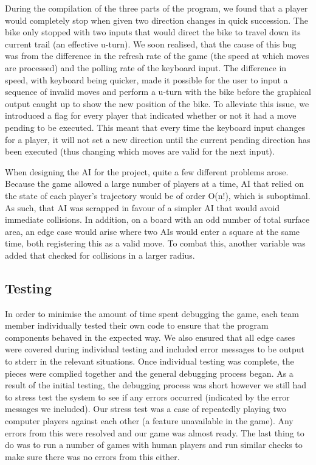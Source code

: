 \documentclass[11pt]{article}
\begin{document}
During the compilation of the three parts of the program, we found that a player would completely stop when given two direction changes in quick succession. The bike only stopped with two inputs that would direct the bike to travel down its current trail (an effective u-turn). We soon realised, that the cause of this bug was from the difference in the refresh rate of the game (the speed at which moves are processed) and the polling rate of the keyboard input. The difference in speed, with keyboard being quicker, made it possible for the user to input a sequence of invalid moves and perform a u-turn with the bike before the graphical output caught up to show the new position of the bike. To alleviate this issue, we introduced a flag for every player that indicated whether or not it had a move pending to be executed. This meant that every time the keyboard input changes for a player, it will not set a new direction until the current pending direction has been executed (thus changing which moves are valid for the next input). \par

When designing the AI for the project, quite a few different problems arose. Because the game allowed a large number of players at a time, AI that relied on the state of each player's trajectory would be of order O(n!), which is suboptimal. As such, that AI was scrapped in favour of a simpler AI that would avoid immediate collisions. In addition, on a board with an odd number of total surface area, an edge case would arise where two AIs would enter a square at the same time, both registering this as a valid move. To combat this, another variable was added that checked for collisions in a larger radius.\par


\subsection{Testing}
In order to minimise the amount of time spent debugging the game, each team member individually tested their own code to ensure that the program components behaved in the expected way. We also ensured that all edge cases were covered during individual testing and  included error messages to be output to stderr in the relevant situations. Once individual testing was complete, the pieces were complied together and the general debugging process began. As a result of the initial testing, the debugging process was short however we still had to stress test the system to see if any errors occurred (indicated by the error messages we included). Our stress test was a case of repeatedly playing two computer players against each other (a feature unavailable in the game). Any errors from this were resolved and our game was almost ready. The last thing to do was to run a number of games with human players and run similar checks to make sure there was no errors from this either.
\end{document}
